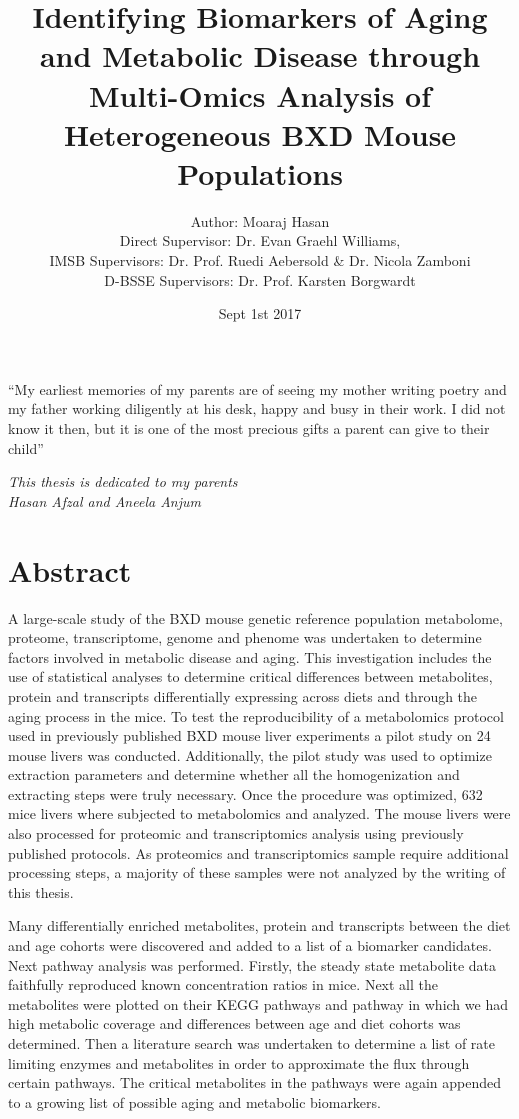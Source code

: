 \documentclass[a4paper]{book}
\title{Identifying Biomarkers of Aging and Metabolic Disease through Multi-Omics Analysis of Heterogeneous BXD Mouse Populations}
\author{Author: Moaraj Hasan\\
	Direct Supervisor: Dr. Evan Graehl Williams, \\
	IMSB Supervisors: Dr. Prof. Ruedi Aebersold \& Dr. Nicola Zamboni \\
	D-BSSE Supervisors: Dr. Prof. Karsten Borgwardt }
\date{Sept 1st 2017}
\begin{document}
	
	\maketitle
	\let\cleardoublepage\clearpage
	
	\chapter*{}
	
	\epigraph{“My earliest memories of my parents are of seeing my mother writing poetry and my father working diligently at his desk, happy and busy in their work. I did not know it then, but it is one of the most precious gifts a parent can give to their child”}{\textit{This thesis is dedicated to my parents \\Hasan Afzal and Aneela Anjum}}
	
	\let\cleardoublepage\clearpage
	
	{
		\tableofcontents{}
	}
	
	\chapter*{Abstract} 

A large-scale study of the BXD mouse genetic reference population metabolome, proteome, transcriptome, genome and phenome was undertaken to determine factors involved in metabolic disease and aging. This investigation includes the use of statistical analyses to determine critical differences between metabolites, protein and transcripts differentially expressing across diets and through the aging process in the mice. 
To test the reproducibility of a metabolomics protocol used in previously published BXD mouse liver experiments a pilot study on 24 mouse livers was conducted. Additionally, the pilot study was used to optimize extraction parameters and determine whether all the homogenization and extracting steps were truly necessary. Once the procedure was optimized, 632 mice livers where subjected to metabolomics and analyzed. The mouse livers were also processed for proteomic and transcriptomics analysis using previously published protocols. As proteomics and transcriptomics sample require additional processing steps, a majority of these samples were not analyzed by the writing of this thesis.

Many differentially enriched metabolites, protein and transcripts between the diet and age cohorts were discovered and added to a list of a biomarker candidates. Next pathway analysis was performed. Firstly, the steady state metabolite data faithfully reproduced known concentration ratios in mice. Next all the metabolites were plotted on their KEGG pathways and pathway in which we had high metabolic coverage and differences between age and diet cohorts was determined. Then a literature search was undertaken to determine a list of rate limiting enzymes and metabolites in order to approximate the flux through certain pathways. The critical metabolites in the pathways were again appended to a growing list of possible aging and metabolic biomarkers. 
\end{document}
